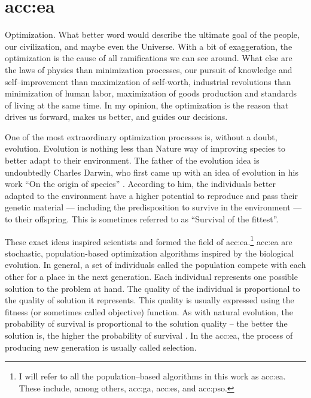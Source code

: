 \chapter{\texorpdfstring{\acrlong*{acc:ea}}{Evolutionary Algorithms}}
\label{chap:eva}

Optimization. What better word would describe the ultimate goal of the people, our civilization, and maybe even the Universe. With a bit of exaggeration, the optimization is the cause of all ramifications we can see around. What else are the laws of physics than minimization processes, our pursuit of knowledge and self--improvement than maximization of self-worth, industrial revolutions than minimization of human labor, maximization of goods production and standards of living at the same time. In my opinion, the optimization is the reason that drives us forward, makes us better, and guides our decisions.

One of the most extraordinary optimization processes is, without a doubt, evolution. Evolution is nothing less than Nature way of improving species to better adapt to their environment. The father of the evolution idea is undoubtedly Charles Darwin, who first came up with an idea of evolution in his work \enquote{On the origin of species} \citep{darwinOriginal}. According to him, the individuals better adapted to the environment have a higher potential to reproduce and pass their genetic material --- including the predisposition to survive in the environment --- to their offspring. This is sometimes referred to as \enquote{Survival of the fittest}.

These exact ideas inspired scientists and formed the field of \acrfull{acc:ea}.\footnote{I will refer to all the population--based algorithms in this work as \acrlong*{acc:ea}. These include, among others, \acrlong*{acc:ga}, \acrlong*{acc:es}, and \acrlong*{acc:pso}.}
\acrshort{acc:ea} are stochastic, population-based optimization algorithms inspired by the biological evolution. In general, a set of individuals called the population compete with each other for a place in the next generation. Each individual represents one possible solution to the problem at hand. The quality of the individual is proportional to the quality of solution it represents. This quality is usually expressed using the fitness (or sometimes called objective) function. As with natural evolution, the probability of survival is proportional to the solution quality -- the better the solution is, the higher the probability of survival \citep{IntroductionToEA}. In the \acrshort{acc:ea}, the process of producing new generation is usually called selection.

